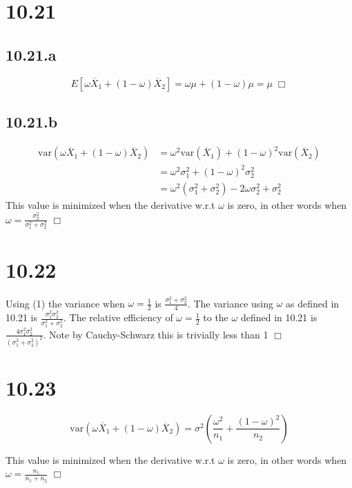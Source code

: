 \documentclass{article}
\newcommand{\var}[1]{\mathrm{var}(#1)}
\begin{document}
\section*{10.21}
\subsection*{10.21.a}
$$E[\omega \overline{X}_1 + (1-\omega)\overline{X}_2] = \omega \mu + (1-\omega)\mu = \mu \; \Box$$
\subsection*{10.21.b}
\begin{equation}
\begin{split}
  \var{\omega \overline{X}_1 + (1-\omega)\overline{X}_2} &= \omega^2 \var{\overline{X}_1} + (1-\omega)^2\var{\overline{X}_2}\\
  &= \omega^2 \sigma_1^2 + (1-\omega)^2\sigma_2^2\\
  &= \omega^2(\sigma_1^2 + \sigma_2^2) - 2\omega\sigma_2^2 + \sigma_2^2
\end{split}
\end{equation}
This value is minimized when the derivative w.r.t $\omega$ is zero, in other words when $\omega = \frac{\sigma_2^2}{\sigma_1^2 + \sigma_2^2}$ $\Box$

\section*{10.22}
Using (1) the variance when $\omega = \frac{1}{2}$ is $\frac{\sigma_1^2 + \sigma_2^2}{4}$. The variance using $\omega$ as defined in 10.21 is $\frac{\sigma_1^2 \sigma_2^2}{\sigma_1^2 + \sigma_2^2}$. The relative efficiency of $\omega = \frac{1}{2}$ to the $\omega$ defined in 10.21 is $\frac{4 \sigma_1^2 \sigma_2^2}{\left(\sigma_1^2 + \sigma_2^2\right)^2}$. Note by Cauchy-Schwarz this is trivially less than 1 $\Box$

\section*{10.23}
\begin{equation}
\var{\omega \overline{X}_1 + (1-\omega)\overline{X}_2} = \sigma^2 \left(\frac{\omega^2}{n_1} + \frac{(1-\omega)^2}{n_2} \right)
\end{equation}

This value is minimized when the derivative w.r.t $\omega$ is zero, in other words when $\omega = \frac{n_1}{n_1 + n_2}$ $\Box$ 
\end{document}
